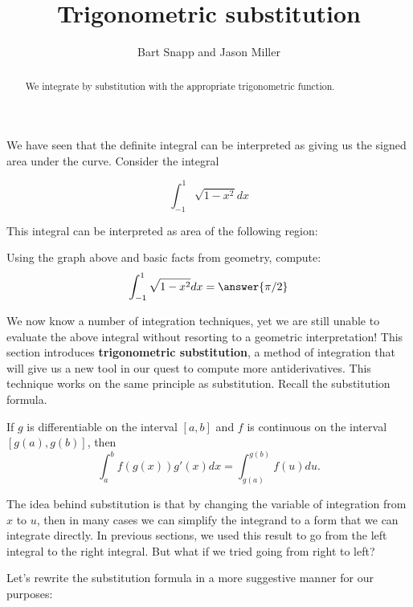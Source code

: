 \documentclass{ximera}
\author{Bart Snapp and Jason Miller}
\title[Dig-In:]{Trigonometric substitution}
\begin{document}
\begin{abstract}
  We integrate by substitution with the appropriate trigonometric
  function.
\end{abstract}
\maketitle

We have seen that the definite integral can be interpreted as giving us the signed area under the curve. Consider the integral 

\[
\int_{-1}^1 \sqrt{1-x^2} dx
\]

 This integral can be interpreted as area of the following region:








\begin{question}
  Using the graph above and basic facts from geometry, compute:
  \[
  \int_{-1}^1 \sqrt{1-x^2} dx = \answer{\pi/2}
  \]
\end{question}

We now know a number of integration techniques, yet we are still
unable to evaluate the above integral without resorting to a geometric
interpretation!  This section introduces \textbf{trigonometric substitution},
a method of integration that will give us a new tool in our quest to compute more antiderivatives.
This technique works on the same principle as substitution. Recall the
substitution formula.

\begin{theorem} 
If $g$ is differentiable on the interval $[a,b]$ and $f$ is
continuous on the interval $[g(a),g(b)]$, then
\[
\int_a^b f(g(x)) g'(x) dx =\int_{g(a)}^{g(b)} f(u) du.
\]
\end{theorem}

The idea behind substitution is that by changing the variable of integration from $x$ to $u$, then in many cases we can 
simplify the integrand to a form that we can integrate directly. In previous sections, 
we used this result to go from the left integral to the right integral. But what if we tried going from right to left? 


Let's rewrite the substitution formula in a more suggestive manner for our purposes:
\end{document}
